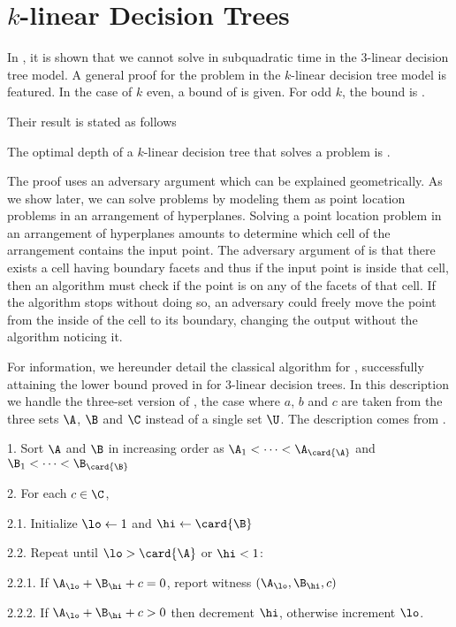\section{$k$-linear Decision Trees}

In \citet*{erickson:1999}, it is shown that we cannot solve \threeSUM in
subquadratic time in the $3$-linear decision tree model. A general
proof for the \kLDT problem in the $k$-linear decision tree model is featured.
In the case of $k$ even, a bound of  is given. For
odd $k$, the bound is .

Their result is stated as follows
\begin{theorem}
The optimal depth of a \(k\)-linear decision tree that solves
a \kLDT problem is .
\end{theorem}

The proof uses an adversary argument which can be explained geometrically. As
we show later, we can solve \kLDT problems
by modeling them as point location problems in an arrangement of hyperplanes.
Solving a point location problem in an arrangement of hyperplanes amounts to
determine which cell of the arrangement contains the input point. The adversary
argument of \citet*{erickson:1999} is that there exists a cell having
 boundary facets and thus if the input point is inside
that cell, then an algorithm must check if the point is on any of the facets of
that cell. If the algorithm stops without doing so, an adversary could freely
move the point from the inside of the cell to its boundary, changing the output
without the algorithm noticing it.

For information, we hereunder detail the classical  algorithm for
\threeSUM, successfully attaining the lower bound proved in
\cite{erickson:1999} for $3$-linear decision trees. In this description we
handle the three-set version of \threeSUM, \ie the case where $a$, $b$ and $c$
are taken from the three sets $\A$, $\B$ and $\C$ instead of a single set $\U$.
The description comes from \citet*{gronlund:2014}.
\begin{algorithm}
\item[1.] Sort $\A$ and $\B$ in increasing order as $\A_1 < \cdots <
\A_{\card{\A}}$ and $\B_1 < \cdots < \B_{\card{\B}}$
\item[2.] For each $c \in \C$,
\item[2.1.] Initialize $\lo \gets 1$ and $\hi \gets \card{\B}$
\item[2.2.] Repeat until $\lo > \card{\A}$ or $\hi < 1$:
\item[2.2.1.] If $\A_{\lo} + \B_{\hi} + c = 0$, report witness $(\A_{\lo},
\B_{\hi}, c)$
\item[2.2.2.] If $\A_{\lo} + \B_{\hi} + c > 0$ then decrement $\hi$, otherwise
increment $\lo$.
\end{algorithm}


